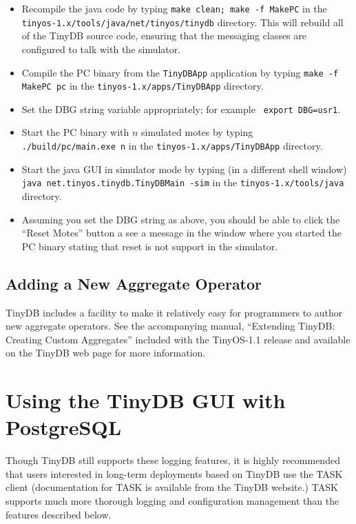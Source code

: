 \documentclass[11pt]{article}
\newcommand{\docroot}{tinyos-1.x}
\begin{document}
\begin{itemize}
\item Recompile the java code by typing {\tt make clean; make -f
    MakePC} in the {\tt \docroot/tools/java/net/tinyos/tinydb}
  directory.  This will rebuild all of the TinyDB source code,
  ensuring that the messaging classes are configured to talk with the
  simulator.
\item Compile the PC binary from the {\tt TinyDBApp} application by
  typing {\tt make -f MakePC pc} in the {\tt \docroot/apps/TinyDBApp}
  directory.
\item Set the DBG string variable appropriately; for example {\tt
    export DBG=usr1}.
\item Start the PC binary with $n$ simulated motes by typing {\tt
    ./build/pc/main.exe n} in the {\tt \docroot/apps/TinyDBApp}
  directory.
\item Start the java GUI in simulator mode by typing (in a different
  shell window) {\tt java net.tinyos.tinydb.TinyDBMain -sim} in the
  {\tt \docroot/tools/java} directory.
\item Assuming you set the DBG string as above, you should be able to
  click the ``Reset Motes'' button a see a message in the window where
  you started the PC binary stating that reset is not support in the
  simulator.
\end{itemize}

\subsection{Adding a New Aggregate Operator}\label{sec:adding-aggs}

TinyDB includes a facility to make it relatively easy for programmers
to author new aggregate operators.  See the accompanying manual,
``Extending TinyDB: Creating Custom Aggregates'' included with the
TinyOS-1.1 release and available on the TinyDB web page for more
information.

\section{Using the TinyDB GUI with PostgreSQL}\label{postgres}

Though TinyDB still supports these logging features, it is highly
recommended that users interested in long-term deployments based on
TinyDB use the TASK client
(documentation for TASK is available from the TinyDB website.) TASK
supports much more thorough logging and configuration management than
the features described below.
\end{document}
